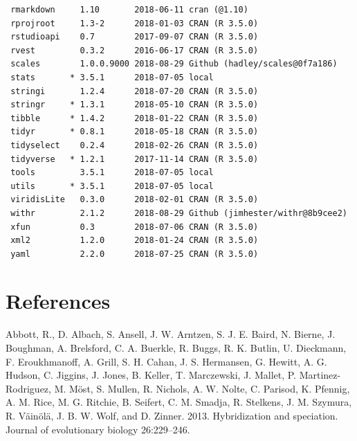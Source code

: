 \documentclass[twoside,12pt,final]{ucthesis-CA2012}
\begin{document}
\begin{ucmainmatter}
\begin{verbatim}
 rmarkdown     1.10       2018-06-11 cran (@1.10)                         
 rprojroot     1.3-2      2018-01-03 CRAN (R 3.5.0)                       
 rstudioapi    0.7        2017-09-07 CRAN (R 3.5.0)                       
 rvest         0.3.2      2016-06-17 CRAN (R 3.5.0)                       
 scales        1.0.0.9000 2018-08-29 Github (hadley/scales@0f7a186)       
 stats       * 3.5.1      2018-07-05 local                                
 stringi       1.2.4      2018-07-20 CRAN (R 3.5.0)                       
 stringr     * 1.3.1      2018-05-10 CRAN (R 3.5.0)                       
 tibble      * 1.4.2      2018-01-22 CRAN (R 3.5.0)                       
 tidyr       * 0.8.1      2018-05-18 CRAN (R 3.5.0)                       
 tidyselect    0.2.4      2018-02-26 CRAN (R 3.5.0)                       
 tidyverse   * 1.2.1      2017-11-14 CRAN (R 3.5.0)                       
 tools         3.5.1      2018-07-05 local                                
 utils       * 3.5.1      2018-07-05 local                                
 viridisLite   0.3.0      2018-02-01 CRAN (R 3.5.0)                       
 withr         2.1.2      2018-08-29 Github (jimhester/withr@8b9cee2)     
 xfun          0.3        2018-07-06 CRAN (R 3.5.0)                       
 xml2          1.2.0      2018-01-24 CRAN (R 3.5.0)                       
 yaml          2.2.0      2018-07-25 CRAN (R 3.5.0)                       
\end{verbatim}
\backmatter

\hypertarget{references}{%
\chapter*{References}\label{references}}


\noindent

\setlength{\parindent}{-0.20in}
\setlength{\leftskip}{0.20in}
\setlength{\parskip}{8pt}

\hypertarget{refs}{}
\leavevmode\hypertarget{ref-abbott_hybridization_2013}{}%
Abbott, R., D. Albach, S. Ansell, J. W. Arntzen, S. J. E. Baird, N.
Bierne, J. Boughman, A. Brelsford, C. A. Buerkle, R. Buggs, R. K.
Butlin, U. Dieckmann, F. Eroukhmanoff, A. Grill, S. H. Cahan, J. S.
Hermansen, G. Hewitt, A. G. Hudson, C. Jiggins, J. Jones, B. Keller, T.
Marczewski, J. Mallet, P. Martinez-Rodriguez, M. Möst, S. Mullen, R.
Nichols, A. W. Nolte, C. Parisod, K. Pfennig, A. M. Rice, M. G. Ritchie,
B. Seifert, C. M. Smadja, R. Stelkens, J. M. Szymura, R. Väinölä, J. B.
W. Wolf, and D. Zinner. 2013. Hybridization and speciation. Journal of
evolutionary biology 26:229--246.


\end{ucmainmatter}
\end{document}
